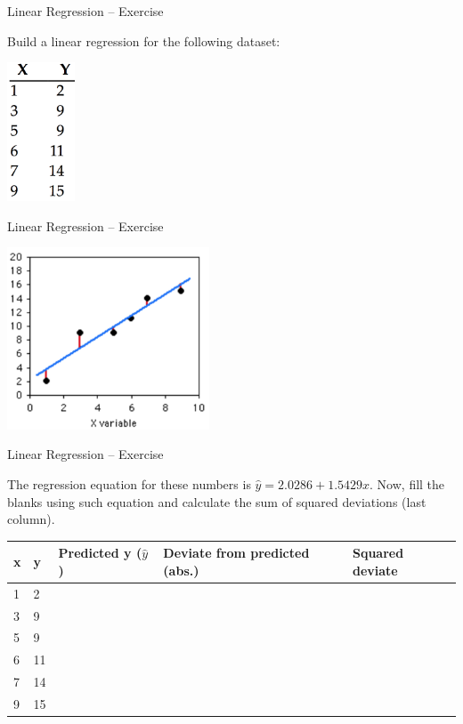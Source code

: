 \documentclass{beamer}
\begin{document}
\begin{frame}
{\centerline{Linear Regression -- Exercise}}

Build a linear regression for the following dataset:
\begin{center}
\includegraphics[width=2cm]{A2022.IDSEPC.RegressioneLineare/points-1.png}
\end{center}

\end{frame}
\begin{frame}
{\centerline{Linear Regression -- Exercise}}

\begin{center}
\includegraphics[width=6cm]{A2022.IDSEPC.RegressioneLineare/points-2.png}   
\end{center}


\end{frame}




\begin{frame}
{\centerline{Linear Regression -- Exercise}}

The regression equation for these numbers is $\hat{y}=2.0286+1.5429x$. Now, fill the blanks using such equation and calculate the sum of squared deviations (last column).
\small
\begin{table}[]
\centering
\begin{tabular}{l | l | l | l| l} 
\hline
x & y & Predicted y ($\hat{y}$) & Deviate from predicted (abs.) & Squared deviate \\
\hline

1 & 2 &  &  &  \\
3 & 9 &  &  &  \\
5 & 9 &  &  &  \\
6 & 11 &  &  &  \\
7 & 14 & &  &  \\
9 & 15 &  &  &  \\

\hline

\end{tabular}
\end{table}
\end{frame}
\end{document}
